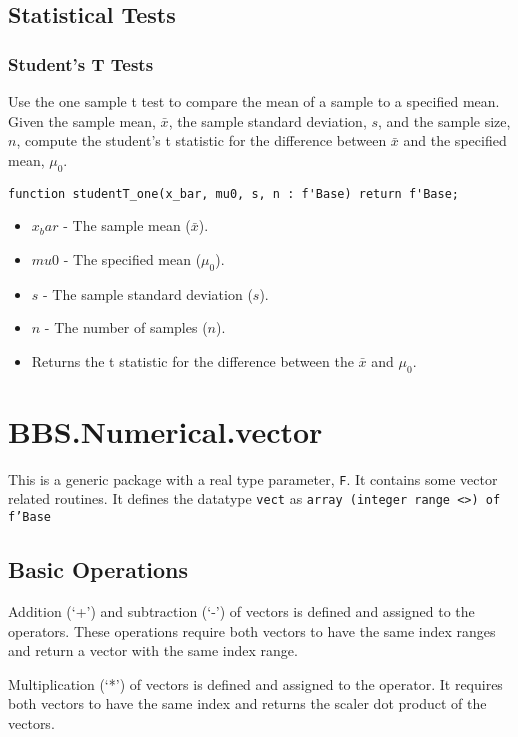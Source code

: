 \documentclass[10pt, openany]{book}
\newcommand{\datatype}[1]{\texttt{#1}}
\begin{document}
\subsection{Statistical Tests}
\subsubsection{Student's T Tests}
Use the one sample t test to compare the mean of a sample to a specified mean.  Given the sample mean, $\bar{x}$, the sample standard deviation, $s$, and the sample size, $n$, compute the student's t statistic for the difference between $\bar{x}$ and the specified mean, $\mu_0$.
\begin{lstlisting}
function studentT_one(x_bar, mu0, s, n : f'Base) return f'Base;
\end{lstlisting}
\begin{itemize}
  \item $x_bar$ - The sample mean ($\bar{x}$).
  \item $mu0$ - The specified mean ($\mu_0$).
  \item $s$ - The sample standard deviation ($s$).
  \item $n$ - The number of samples ($n$).
  \item Returns the t statistic for the difference between the $\bar{x}$ and $\mu_0$.
\end{itemize}

\section{BBS.Numerical.vector}
This is a generic package with a real type parameter, \datatype{F}.  It contains some vector related routines.  It defines the datatype \datatype{vect} as \datatype{array (integer range <>) of f'Base}

\subsection{Basic Operations}
Addition (`+') and subtraction (`-') of vectors is defined and assigned to the operators.  These operations require both vectors to have the same index ranges and return a vector with the same index range.

Multiplication (`*') of vectors is defined and assigned to the operator.  It requires both vectors to have the same index and returns the scaler dot product of the vectors.
\end{document}
